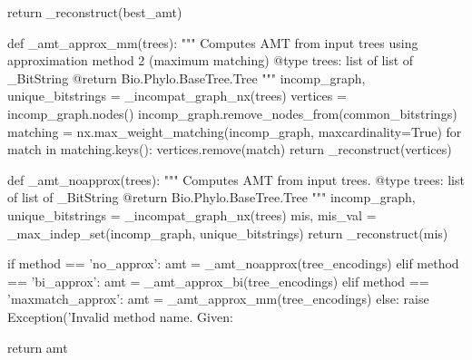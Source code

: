 \documentclass[a4paper, 12pt]{book}
\begin{document}
\begin{python}
    return _reconstruct(best_amt)

  def _amt_approx_mm(trees):
    """
    Computes AMT from input trees using approximation 
    method 2 (maximum matching)
    @type trees: list of list of _BitString
    @return Bio.Phylo.BaseTree.Tree
    """
    incomp_graph, unique_bitstrings = _incompat_graph_nx(trees)
    vertices = incomp_graph.nodes()
    incomp_graph.remove_nodes_from(common_bitstrings)
    matching = nx.max_weight_matching(incomp_graph, maxcardinality=True)
    for match in matching.keys():
      vertices.remove(match)
    return _reconstruct(vertices)

  def _amt_noapprox(trees):
    """
    Computes AMT from input trees.
    @type trees: list of list of _BitString
    @return Bio.Phylo.BaseTree.Tree
    """
    incomp_graph, unique_bitstrings = _incompat_graph_nx(trees)
    mis, mis_val = _max_indep_set(incomp_graph, unique_bitstrings)
    return _reconstruct(mis)

  if method == 'no_approx':
    amt = _amt_noapprox(tree_encodings)
  elif method == 'bi_approx':
    amt = _amt_approx_bi(tree_encodings)
  elif method == 'maxmatch_approx':
    amt = _amt_approx_mm(tree_encodings)
  else:
    raise Exception('Invalid method name. Given: %

  return amt
\end{python}
\end{document}
